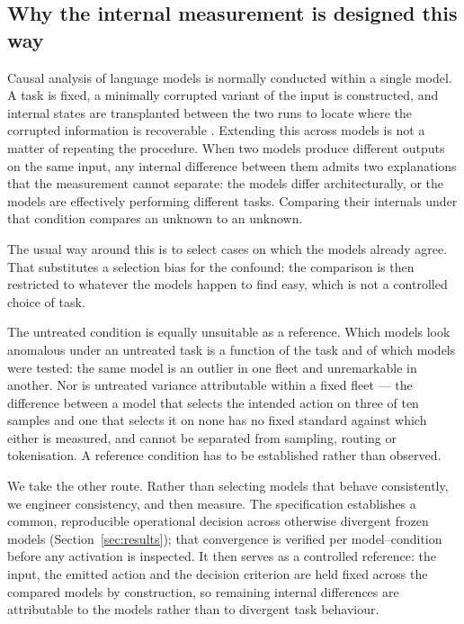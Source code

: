 \subsection{Why the internal measurement is designed this way}
\label{sec:design-rationale}

Causal analysis of language models is normally conducted within a single model. A
task is fixed, a minimally corrupted variant of the input is constructed, and
internal states are transplanted between the two runs to locate where the corrupted
information is recoverable \citep{vig2020causal,meng2022locating}. Extending this
across models is not a matter of repeating the procedure. When two models produce
different outputs on the same input, any internal difference between them admits two
explanations that the measurement cannot separate: the models differ
architecturally, or the models are effectively performing different tasks. Comparing
their internals under that condition compares an unknown to an unknown.

The usual way around this is to select cases on which the models already agree. That
substitutes a selection bias for the confound: the comparison is then restricted to
whatever the models happen to find easy, which is not a controlled choice of task.

The untreated condition is equally unsuitable as a reference. Which models look
anomalous under an untreated task is a function of the task and of which models were
tested: the same model is an outlier in one fleet and unremarkable in another. Nor is
untreated variance attributable within a fixed fleet --- the difference between a
model that selects the intended action on three of ten samples and one that selects
it on none has no fixed standard against which either is measured, and cannot be
separated from sampling, routing or tokenisation. A reference condition has to be
established rather than observed.

We take the other route. Rather than selecting models that behave consistently, we
engineer consistency, and then measure. The specification establishes a common,
reproducible operational decision across otherwise divergent frozen models
(Section~\ref{sec:results}); that convergence is verified per model--condition before
any activation is inspected. It then serves as a controlled reference: the input, the
emitted action and the decision criterion are held fixed across the compared models
by construction, so remaining internal differences are attributable to the models
rather than to divergent task behaviour.

